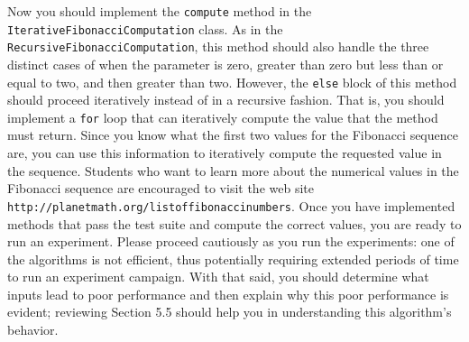 \documentclass[11pt]{article}
\newcommand{\command}[1]{``\lstinline{#1}''}
\newcommand{\program}[1]{\lstinline{#1}}
\newcommand{\url}[1]{\lstinline{#1}}
\begin{document}
Now you should implement the \program{compute} method in the
\program{IterativeFibonacciComputation} class. As in the
\program{RecursiveFibonacciComputation}, this method should also handle the
three distinct cases of when the parameter is zero, greater than zero but less
than or equal to two, and then greater than two. However, the \program{else}
block of this method should proceed iteratively instead of in a recursive
fashion. That is, you should implement a \program{for} loop that can iteratively
compute the value that the method must return. Since you know what the first two
values for the Fibonacci sequence are, you can use this information to
iteratively compute the requested value in the sequence. Students who want to
learn more about the numerical values in the Fibonacci sequence are encouraged
to visit the web site \url{http://planetmath.org/listoffibonaccinumbers}. Once
you have implemented methods that pass the test suite and compute the correct
values, you are ready to run an experiment. Please proceed cautiously as you run
the experiments: one of the algorithms is not efficient, thus potentially
requiring extended periods of time to run an experiment campaign. With that
said, you should determine what inputs lead to poor performance and then explain
why this poor performance is evident; reviewing Section 5.5 should help you in
understanding this algorithm's behavior.

\end{document}

